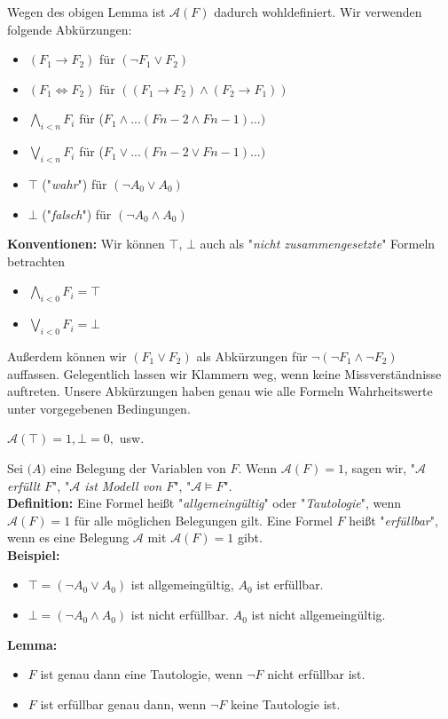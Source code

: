 \documentclass{scrartcl}
\begin{document}
Wegen des obigen Lemma ist $\mathcal{A}(F)$ dadurch wohldefiniert. Wir verwenden folgende Abk\"urzungen:
\begin{itemize}
\item $(F_1 \rightarrow F_2)$ f\"ur $(\neg F_1 \vee F_2)$
\item $(F_1 \Leftrightarrow F_2)$ f\"ur $((F_1 \rightarrow F_2) \wedge (F_2 \rightarrow F_1))$
\item $\bigwedge_{i < n}{F_i}$ f\"ur ($F_1 \wedge ... (F{n-2} \wedge F{n-1}) ... )$
\item $\bigvee_{i < n}{F_i}$ f\"ur ($F_1 \vee ... (F{n-2} \vee F{n-1}) ... )$
\item $\top$ ("\textit{wahr}") f\"ur $(\neg A_0 \vee A_0)$
\item $\bot$ ("\textit{falsch}") f\"ur $(\neg A_0 \wedge A_0)$
\end{itemize}
\textbf{Konventionen:} Wir k\"onnen $\top$, $\bot$ auch als "\textit{nicht zusammengesetzte}" Formeln betrachten
\begin{itemize}
\item $\bigwedge_{i < 0}{F_i} = \top$
\item $\bigvee_{i < 0}{F_i} = \bot$
\end{itemize}
Au{\ss}erdem k\"onnen wir $(F_1 \vee F_2)$ als Abk\"urzungen f\"ur $\neg(\neg F_1 \wedge \neg F_2)$ auffassen. Gelegentlich lassen wir Klammern weg, wenn keine Missverst\"andnisse auftreten. Unsere Abk\"urzungen haben genau wie alle Formeln Wahrheitswerte unter vorgegebenen Bedingungen.\\
\begin{center}
$\mathcal{A}(\top) = 1, \mathcal{\bot} = 0,$ usw.
\end{center}
Sei $\mathcal(A)$ eine Belegung der Variablen von $F$. Wenn $\mathcal{A}(F) = 1$, sagen wir, "\textit{$\mathcal{A}$ erf\"ullt $F$}", "\textit{$\mathcal{A}$ ist Modell von $F$}", "\textit{$\mathcal{A} \models F$}".\\
\textbf{Definition:} Eine Formel hei{\ss}t "\textit{allgemeing\"ultig}" oder "\textit{Tautologie}", wenn $\mathcal{A}(F) = 1$ f\"ur alle m\"oglichen Belegungen gilt. Eine Formel $F$ hei{\ss}t "\textit{erf\"ullbar}", wenn es eine Belegung $\mathcal{A}$ mit $\mathcal{A}(F) = 1$ gibt.\\
\textbf{Beispiel:}
\begin{itemize}
\item $\top = (\neg A_0 \vee A_0)$ ist allgemeing\"ultig, $A_0$ ist erf\"ullbar.
\item $\bot = (\neg A_0 \wedge A_0)$ ist nicht erf\"ullbar. $A_0$ ist nicht allgemeing\"ultig.
\end{itemize}
\textbf{Lemma:} 
\begin{itemize}
\item $F$ ist genau dann eine Tautologie, wenn $\neg F$ nicht erf\"ullbar ist.
\item $F$ ist erf\"ullbar genau dann, wenn $\neg F$ keine Tautologie ist.
\end{itemize}
\end{document}
